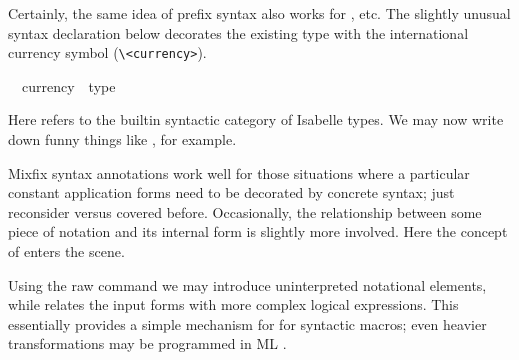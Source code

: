 \begin{isabellebody}
\begin{isamarkuptext}
  \medskip Certainly, the same idea of prefix syntax also works for
  ,  etc.  The slightly
  unusual syntax declaration below decorates the existing  type with the international currency symbol \isa{{\isasymcurrency}}
  (\verb,\,\verb,<currency>,).%
\end{isamarkuptext}%
\isamarkuptrue%
\isanewline
\ \ currency\ {\isacharcolon}{\isacharcolon}\ type\ \ \ \ {\isacharparenleft}{\isachardoublequote}{\isasymcurrency}{\isachardoublequote}{\isacharparenright}\isamarkupfalse%
%
\begin{isamarkuptext}%
\noindent Here  refers to the builtin syntactic category
  of Isabelle types.  We may now write down funny things like , for example.%
\end{isamarkuptext}%
\isamarkuptrue%
%
\isamarkuptrue%
%
\begin{isamarkuptext}%
Mixfix syntax annotations work well for those situations where a
  particular constant application forms need to be decorated by
  concrete syntax; just reconsider  versus  covered before.  Occasionally, the relationship between some
  piece of notation and its internal form is slightly more involved.
  Here the concept of  enters the scene.

  Using the raw  command we
  may introduce uninterpreted notational elements, while
   relates the input forms with more complex
  logical expressions.  This essentially provides a simple mechanism
  for for syntactic macros; even heavier transformations may be
  programmed in ML \cite{isabelle-ref}.


\end{isamarkuptext}
\end{isabellebody}
